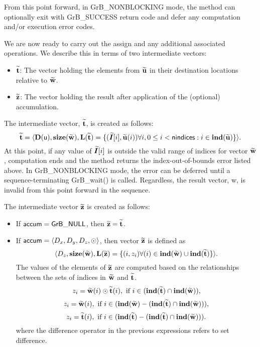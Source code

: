 From this point forward, in {\sf GrB\_NONBLOCKING} mode, the method can 
optionally exit with {\sf GrB\_SUCCESS} return code and defer any computation 
and/or execution error codes.

We are now ready to carry out the assign and any additional 
associated operations.  We describe this in terms of two intermediate vectors:
\begin{itemize}
    \item ${\bf \widetilde{t}}$: The vector holding the elements from
    ${\bf \widetilde{u}}$ in their destination locations relative to 
    ${\bf \widetilde{w}}$.
    
    \item ${\bf \widetilde{z}}$: The vector holding the result after 
    application of the (optional) accumulation.
\end{itemize}

The intermediate vector, ${\bf \widetilde{t}}$, is created as follows:
\[
{\bf \widetilde{t}} = \langle
\bold{D}({\sf u}), \bold{size}({\bf \widetilde{w}}),
\bold{L}({\bf \widetilde{t}}) =
\{(\bm{\widetilde{I}}[i],{\bf \widetilde{u}}(i)) \forall i, 0 \leq i < {\sf nindices} : 
i \in \bold{ind}({\bf \widetilde{u}}) \} \rangle. 
\]
At this point, if any value of $\bm{\widetilde{I}}[i]$ is outside the valid 
range of indices for vector ${\bf \widetilde{w}}$, computation ends and the 
method returns the index-out-of-bounds error listed above. In 
{\sf GrB\_NONBLOCKING} mode, the error can be deferred until a 
sequence-terminating {\sf GrB\_wait()} is called.  Regardless, the result 
vector, {\sf w}, is invalid from this point forward in the 
sequence.

The intermediate vector ${\bf \widetilde{z}}$ is created as follows:
\begin{itemize}
    \item If ${\sf accum} = {\sf GrB\_NULL}$, then 
    ${\bf \widetilde{z}} = {\bf \widetilde{t}}$.

    \item If ${\sf accum} = \langle D_x, D_y, D_z, \odot \rangle$, then vector 
    ${\bf \widetilde{z}}$ is defined as 
        \[ \langle D_z, \bold{size}({\bf \widetilde{w}}), \bold{L}({\bf \widetilde{z}})
		= \{(i,z_{i})  \forall (i) \in \bold{ind}({\bf \widetilde{w}}) \cup 
        \bold{ind}({\bf \widetilde{t}}) \} \rangle.\]
    The values of the elements of ${\bf \widetilde{z}}$ are computed based on the relationships between the sets of indices in ${\bf \widetilde{w}}$ and ${\bf \widetilde{t}}$.
\[
z_{i} = {\bf \widetilde{w}}(i) \odot {\bf \widetilde{t}}(i), \ \mbox{if}\  i \in  (\bold{ind}({\bf \widetilde{t}}) \cap \bold{ind}({\bf \widetilde{w}})),
\]
\[
z_{i} = \vector{\widetilde{w}}(i), \ \mbox{if}\  i \in  (\bold{ind}(\vector{\widetilde{w}}) - (\bold{ind}(\vector{\widetilde{t}}) \cap \bold{ind}(\vector{\widetilde{w}}))),
\]
\[
z_{i} = \vector{\widetilde{t}}(i), \ \mbox{if}\  i \in  (\bold{ind}(\vector{\widetilde{t}}) - (\bold{ind}(\vector{\widetilde{t}}) \cap \bold{ind}(\vector{\widetilde{w}}))).
\]
where the difference operator in the previous expressions refers to set difference.
\end{itemize}

